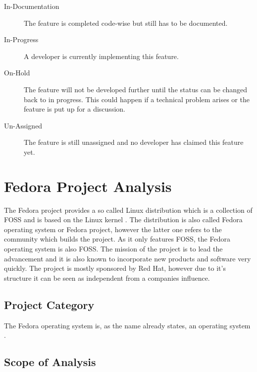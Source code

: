 \begin{description}
\begin{description}
      \item[In-Documentation] The feature is completed code-wise but still
        has to be documented.

      \item[In-Progress] A developer is currently implementing this feature.

      \item[On-Hold] The feature will not be developed further until the
        status can be changed back to in progress. This could happen if a
        technical problem arises or the feature is put up for a discussion.

      \item[Un-Assigned] The feature is still unassigned and no developer has
        claimed this feature yet.

    \end{description}

\end{description}


\section{Fedora Project Analysis} %


The Fedora project provides a so called Linux distribution which is a
collection of \ac{FOSS} and is based on the Linux kernel
\cite{FedoraAbout,FedoraTogami}. The distribution is also called Fedora
operating system or Fedora project, however the latter one refers to the
community which builds the project. As it only features \ac{FOSS}, the Fedora
operating system is also \ac{FOSS}. The mission of the project is to lead the
advancement and it is also known to incorporate new products and software very
quickly. The project is mostly sponsored by Red Hat, however due to it's
structure it can be seen as independent from a companies influence.

\subsection{Project Category}

The Fedora operating system is, as the name already states, an operating system
\cite{FedoraAbout}.

\subsection{Scope of Analysis}

